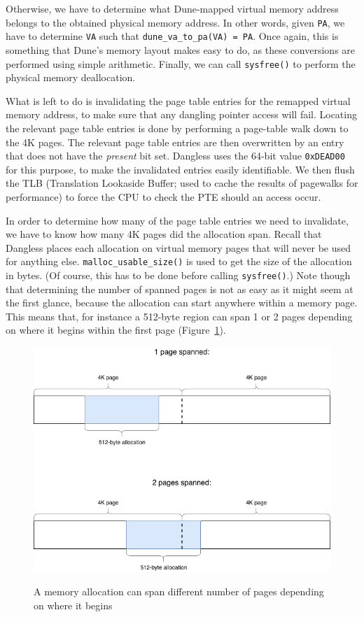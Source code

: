 Otherwise, we have to determine what Dune-mapped virtual memory address belongs to the obtained physical memory address. In other words, given \lstinline!PA!, we have to determine \lstinline!VA! such that \lstinline!dune_va_to_pa(VA) = PA!. Once again, this is something that Dune's memory layout makes easy to do, as these conversions are performed using simple arithmetic. Finally, we can call \lstinline!sysfree()! to perform the physical memory deallocation.

What is left to do is invalidating the page table entries for the remapped virtual memory address, to make sure that any dangling pointer access will fail. Locating the relevant page table entries is done by performing a page-table walk down to the 4K pages. The relevant page table entries are then overwritten by an entry that does not have the \emph{present} bit set. Dangless uses the 64-bit value \lstinline!0xDEAD00! for this purpose, to make the invalidated entries easily identifiable. We then flush the TLB (Translation Lookaside Buffer; used to cache the results of pagewalks for performance) to force the CPU to check the PTE should an access occur.

In order to determine how many of the page table entries we need to invalidate, we have to know how many 4K pages did the allocation span. Recall that Dangless places each allocation on virtual memory pages that will never be used for anything else. \lstinline!malloc_usable_size()! is used to get the size of the allocation in bytes. (Of course, this has to be done before calling \lstinline!sysfree()!.) Note though that determining the number of spanned pages is not as easy as it might seem at the first glance, because the allocation can start anywhere within a memory page. This means that, for instance a 512-byte region can span 1 or 2 pages depending on where it begins within the first page (Figure~\ref{fig:allocation-spanned-pages}).

\begin{figure}
	\centering
	\includegraphics[width=\textwidth]{diagrams/allocation_spanned_pages.png}
	\label{fig:allocation-spanned-pages}
	\caption{A memory allocation can span different number of pages depending on where it begins}
\end{figure}

